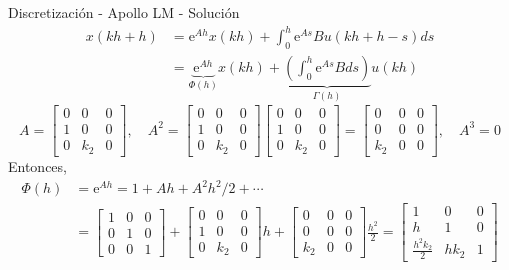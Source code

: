 \documentclass[presentation,aspectratio=1610]{beamer}
\begin{document}
\begin{frame}[label={sec:org0ef5b24}]{Discretización - Apollo LM - Solución}
 \begin{align*}
  x(kh+h) &= \mathrm{e}^{Ah} x(kh) + \int_{0}^{h} \mathrm{e}^{As} B u(kh+h-s) ds\\
   &= \underbrace{\mathrm{e}^{Ah}}_{\Phi(h)} x(kh) + \underbrace{\left(\int_{0}^h \mathrm{e}^{As} B ds \right)}_{\Gamma(h)} u(kh)
\end{align*}
\[ A = \begin{bmatrix} 0 & 0 & 0\\1 & 0 & 0\\0 & k_2 & 0\end{bmatrix}, \quad A^2 = \begin{bmatrix} 0 & 0 & 0\\1 & 0 & 0\\0 & k_2 & 0\end{bmatrix}\begin{bmatrix} 0 & 0 & 0\\1 & 0 & 0\\0 & k_2 & 0\end{bmatrix}= \begin{bmatrix} 0 & 0 & 0\\0 & 0 & 0\\k_2 & 0  & 0\end{bmatrix}, \quad A^3 = 0\]
Entonces,
\begin{align*}
 \Phi(h) &= \mathrm{e}^{Ah} = 1 + Ah + A^2 h^2/2  + \cdots \\
 &= \begin{bmatrix} 1 & 0 & 0\\0 & 1 & 0\\0 & 0 & 1\end{bmatrix} + \begin{bmatrix} 0 & 0 & 0\\1 & 0 & 0\\0 & k_2 & 0\end{bmatrix}h + \begin{bmatrix} 0 & 0 & 0\\0 & 0 & 0\\k_2 & 0 & 0\end{bmatrix}\frac{h^ 2}{2}= \begin{bmatrix} 1 & 0 & 0\\h & 1 & 0\\\frac{h^2k_2}{2} & hk_2 & 1\end{bmatrix}
 \end{align*}
\end{frame}
\end{document}

